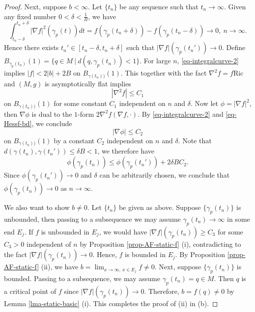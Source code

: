 \documentclass[12pt]{amsart}
\theoremstyle{remark}
\numberwithin{equation}{section}
\newcommand{\Ric}{\mbox{Ric}}
\newcommand{\be}{\begin{equation}}
\newcommand{\ee}{\end{equation}}
\newcommand{\bee}{\begin{equation*}}
\newcommand{\eee}{\end{equation*}}
\begin{document}
\begin{proof}
Next, suppose $b<\infty$.  Let $\{ t_n \} $ be any sequence such that  $ t_n \to\infty$.
Given any fixed number   $ 0  < \delta <  \frac{1}{B}  $, we have
\bee
\int_{t_n-\delta}^{t_n+\delta}|\nabla f|^2(\gamma_p (t))dt
=  f(\gamma_p(t_n+\delta))-f(\gamma_p(t_n-\delta)) \rightarrow  0, \ n \to \infty .
\eee
Hence   there exists   $t_n'\in[t_n-\delta,t_n+\delta]$  such that $|\nabla f|(\gamma_p (t_n') )\to 0$.
Define $B_{\gamma_p (t_n) }  (1) = \{ q \in M \ | \ d (q , {\gamma_p (t_n) } ) < 1 \} $.
For large $n$,   \eqref{eq-integralcurve-2} implies   $|f|<2 |b|+2B$ on $B_{\gamma(t_n))}(1)$.
This together with the fact    $ \nabla^2 f = f \Ric $ and $(M, g)$ is asymptotically flat implies
 \be \label{eq-Hessf-bd}
 |\nabla^2f| \le C_1
 \ee
  on  $B_{\gamma(t_n))}(1)$ for some  constant $C_1$  independent on $n$ and $\delta$.
Now let $\phi = | \nabla f |^2$, then $ \nabla \phi $ is dual to the $1$-form
  $ 2 \nabla^2 f (\nabla f , \cdot)  . $
  By \eqref{eq-integralcurve-2} and \eqref{eq-Hessf-bd},
  we conclude
  $$ | \nabla \phi |  \le C_2 $$   on $B_{\gamma(t_n))}(1)$ by a constant $C_2$ independent on $n$ and $\delta$.
Note that  $d(\gamma(t_n),\gamma(t_n'))\le \delta B < 1 $, we therefore have
$$
\phi (\gamma_p(t_n))\le \phi(\gamma_p (t_n'))+2\delta B C_2.
$$
Since $\phi (\gamma_p (t_n'))\to0$ and $\delta$ can be arbitrarily chosen, we conclude that $\phi (\gamma_p(t_n)) \to 0 $ as $n\to\infty$.

We also want to show $b\neq0$. Let $\{ t_n \}$ be given as above.
Suppose $ \{ \gamma_p (t_n) \} $ is unbounded, then  passing to a subsequence we may assume
$\gamma_p (t_n) \to \infty $  in  some end $E_j$.  If $f$ is unbounded in $E_j$,  we would have
$|\nabla f|(\gamma_p (t_n) ) \ge C_3$ for some $C_3>0$ independent of $n$ by Proposition \ref{prop-AF-static-f} (i),
contradicting to  the fact $ | \nabla f | (\gamma_p (t_n) ) \rightarrow 0$.
Hence, $f$ is  bounded in $E_j$. By  Proposition \ref{prop-AF-static-f} (ii), we have  $b = \lim_{ x \rightarrow \infty, \ x \in E_j} f \neq0$.
Next,  suppose $\{ \gamma_p (t_n ) \}$ is bounded. Passing to a subsequence, we may assume
$\gamma_p (t_n)=q \in M$.  Then $q$ is a critical point of $f$ since $ | \nabla f | (\gamma_p (t_n) ) \rightarrow 0$.
Therefore, $b=f(q)\neq 0$ by Lemma \ref{lma-static-basic} (i). This completes the proof of (ii) in (b).


\end{proof}
\end{document}
